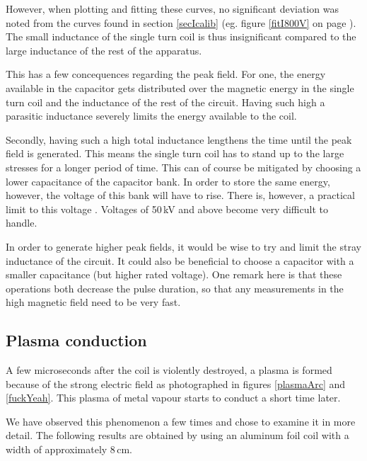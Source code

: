 However, when plotting and fitting these curves, no significant deviation 
was noted from the curves found in section \ref{secIcalib} (eg. figure 
\ref{fitI800V} on page \pageref{fitI800V}). The small inductance of the 
single turn coil is thus insignificant compared to the large inductance of 
the rest of the apparatus.

This has a few concequences regarding the peak field. For one, the energy 
available in the capacitor gets distributed over the magnetic energy in the 
single turn coil and the inductance of the rest of the circuit. Having such 
high a parasitic inductance severely limits the energy available to the 
coil.

Secondly, having such a high total inductance lengthens the time until the 
peak field is generated. This means the single turn coil has to stand up to 
the large stresses for a longer period of time. This can of course be 
mitigated by choosing a lower capacitance of the capacitor bank. In order 
to store the same energy, however, the voltage of this bank will have to 
rise. There is, however, a practical limit to this voltage \cite{herlach}.  
Voltages of 50\,kV and above become very difficult to handle.

In order to generate higher peak fields, it would be wise to try and limit 
the stray inductance of the circuit. It could also be beneficial to choose 
a capacitor with a smaller capacitance (but higher rated voltage). One 
remark here is that these operations both decrease the pulse duration, so 
that any measurements in the high magnetic field need to be very fast.


\subsection{Plasma conduction}


A few microseconds after the coil is violently destroyed, a plasma is 
formed because of the strong electric field as photographed in figures 
\ref{plasmaArc} and \ref{fuckYeah}. This plasma of metal vapour starts to 
conduct a short time later.

We have observed this phenomenon a few times and chose to examine it in 
more detail. The following results are obtained by using an aluminum foil 
coil with a width of approximately 8\,cm.

